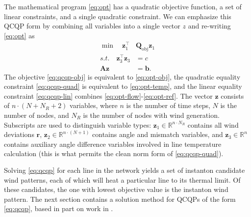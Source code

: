 \documentclass[journal,twoside]{IEEEtran}
\renewcommand{\vec}[1]{\mathbf{#1}}
\begin{document}
The mathematical program \eqref{eq:opt} has a quadratic objective function, a set of linear constraints, and a single quadratic constraint. We can emphasize this QCQP form by combining all variables into a single vector $z$ and re-writing \eqref{eq:opt} as
\begin{subequations}\label{eq:qcqp}
\begin{align}
\label{eq:qcqp-obj} \min\quad \vec{z}_1^\top &\mathbf{Q}_\text{obj} \vec{z}_1 \\
\label{eq:qcqp-quad}s.t.\quad \vec{z}_3^\top \vec{z}_3 &= c \\
\label{eq:qcqp-lin} \mathbf{A}\vec{z} &= \vec{b}.
\end{align}
\end{subequations}
The objective \eqref{eq:qcqp-obj} is equivalent to \eqref{eq:opt-obj}, the quadratic equality constraint \eqref{eq:qcqp-quad} is equivalent to \eqref{eq:opt-temp}, and the linear equality constraint \eqref{eq:qcqp-lin} combines \eqref{eq:opt-flow}-\eqref{eq:opt-ref}. The vector $\vec{z}$ consists of $n\cdot(N+N_R+2)$ variables, where $n$ is the number of time steps, $N$ is the number of nodes, and $N_R$ is the number of nodes with wind generation. Subscripts are used to distinguish variable types: $\vec{z}_1\in\mathbb{R}^{n\cdot N_R}$ contains all wind deviations $\vec{r}$, $\vec{z}_2\in\mathbb{R}^{n\cdot(N+1)}$ contains angle and mismatch variables, and $\vec{z}_3\in\mathbb{R}^n$ contains auxiliary angle difference variables involved in line temperature calculation (this is what permits the clean norm form of \eqref{eq:qcqp-quad}).

Solving \eqref{eq:qcqp} for each line in the network yields a set of instanton candidate wind patterns, each of which will heat a particular line to its thermal limit. Of these candidates, the one with lowest objective value is the instanton wind pattern. The next section contains a solution method for QCQPs of the form \eqref{eq:qcqp}, based in part on work in \cite{bienstock2014}.
\end{document}
